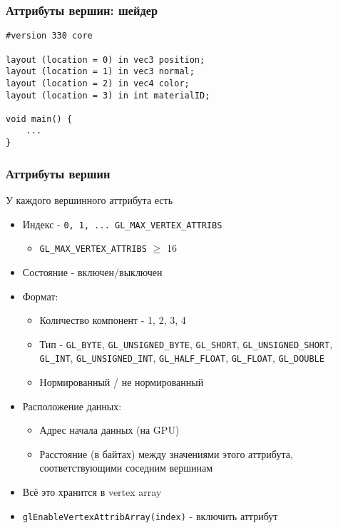 \documentclass{beamer}
\begin{document}
\begin{frame}[fragile]
\frametitle{Аттрибуты вершин: шейдер}
\begin{verbatim}
#version 330 core

layout (location = 0) in vec3 position;
layout (location = 1) in vec3 normal;
layout (location = 2) in vec4 color;
layout (location = 3) in int materialID;

void main() {
    ...
}
\end{verbatim}
\end{frame}

\begin{frame}[fragile]
\frametitle{Аттрибуты вершин}
У каждого вершинного аттрибута есть
\begin{itemize}
\item Индекс - \verb|0, 1, ... GL_MAX_VERTEX_ATTRIBS|
\pause
\begin{itemize}
\item \verb|GL_MAX_VERTEX_ATTRIBS| \begin{math}\geq\end{math} 16
\end{itemize}
\pause
\item Состояние - включен/выключен
\pause
\item Формат:
\begin{itemize}
\item Количество компонент - 1, 2, 3, 4
\pause
\item Тип - \verb|GL_BYTE|, \verb|GL_UNSIGNED_BYTE|, \verb|GL_SHORT|, \verb|GL_UNSIGNED_SHORT|, \verb|GL_INT|, \verb|GL_UNSIGNED_INT|, \verb|GL_HALF_FLOAT|, \verb|GL_FLOAT|, \verb|GL_DOUBLE|
\pause
\item Нормированный / не нормированный
\end{itemize}
\pause
\item Расположение данных:
\begin{itemize}
\item Адрес начала данных (на GPU)
\item Расстояние (в байтах) между значениями этого аттрибута, соответствующими соседним вершинам
\end{itemize}
\pause
\item Всё это хранится в vertex array
\pause
\item \verb|glEnableVertexAttribArray(index)| - включить аттрибут
\end{itemize}
\end{frame}
\end{document}
